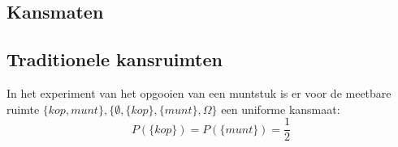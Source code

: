 \documentclass[main.tex]{subfiles}
\begin{document}
\subsection*{Kansmaten}

\subsection*{Traditionele kansruimten}
\begin{vb}
  In het experiment van het opgooien van een muntstuk is er voor de meetbare ruimte $\{kop,munt\}, \{ \emptyset, \{kop\}, \{munt\}, \Omega \}$ een uniforme kansmaat:
  \[ P(\{kop\}) = P(\{munt\}) = \frac{1}{2} \]
\end{vb}

\end{document}

